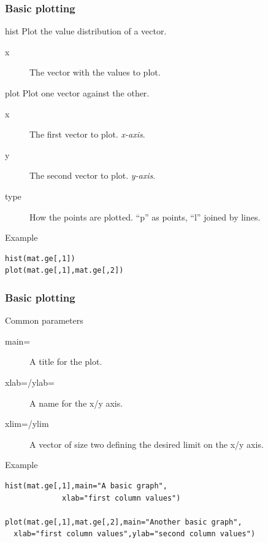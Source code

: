 \documentclass[10pt]{beamer}
\newenvironment{xframe}[2][]
  {\begin{frame}[fragile,environment=xframe,#1]
  \frametitle{#2}}
  {\end{frame}}
\begin{document}
\begin{xframe}{Basic plotting}
  \begin{block}{{\sf hist}}
    Plot the value distribution of a {\sf vector}.
    \begin{description}
    \item[x] The {\sf vector} with the values to plot.
    \end{description}
  \end{block}
  \begin{block}{{\sf plot}}
    Plot one {\sf vector} against the other.
    \begin{description}
      \item[x] The first {\sf vector} to plot. {\it x-axis}. 
      \item[y] The second {\sf vector} to plot. {\it y-axis}. 
      \item[type] How the points are plotted. ``p'' as points, ``l'' joined by lines.
    \end{description}
  \end{block}
  \begin{exampleblock}{Example}
\begin{verbatim}
hist(mat.ge[,1])
plot(mat.ge[,1],mat.ge[,2])
\end{verbatim}  
  \end{exampleblock}
\end{xframe}


\begin{xframe}{Basic plotting}
  \begin{block}{Common parameters}
    \begin{description}
    \item[main=] A title for the plot.
    \item[xlab=/ylab=] A name for the x/y axis.
    \item[xlim=/ylim] A {\sf vector} of size two defining the desired limit on the x/y axis.
    \end{description}
  \end{block}
  \begin{exampleblock}{Example}
\begin{verbatim}
hist(mat.ge[,1],main="A basic graph",
             xlab="first column values")

plot(mat.ge[,1],mat.ge[,2],main="Another basic graph",
  xlab="first column values",ylab="second column values")
\end{verbatim}  
  \end{exampleblock}
\end{xframe}
\end{document}
